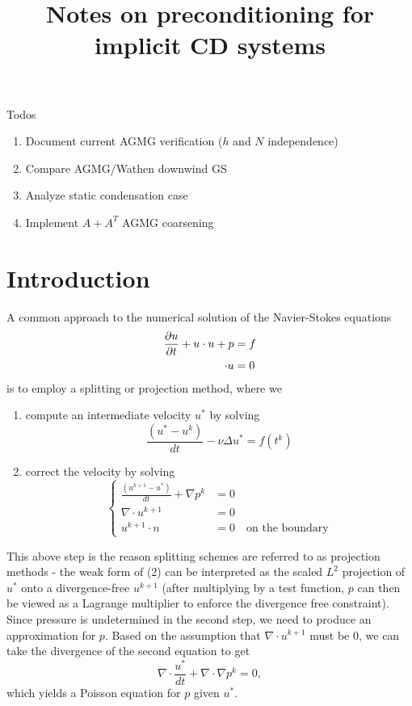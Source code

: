 \documentclass[final,leqno]{siamltex}
\title{Notes on preconditioning for implicit CD systems}
\let\grad\relax
\newcommand{\grad}{\nabla}
\renewcommand{\div}{\grad \cdot}
\newcommand{\pd}[2]{\frac{\partial#1}{\partial#2}}
\begin{document}
\maketitle
Todos
\begin{enumerate}
\item Document current AGMG verification ($h$ and $N$ independence)
\item Compare AGMG/Wathen downwind GS
\item Analyze static condensation case
\item Implement $A+A^T$ AGMG coarsening
\end{enumerate}

\section{Introduction}

A common approach to the numerical solution of the Navier-Stokes equations
\begin{align*}
\pd{u}{t} + u\cdot\grad u + \grad p &= f \\
\div u &= 0
\end{align*}
is to employ a splitting or projection method, where we 
\begin{enumerate}
\item compute an intermediate velocity $u^*$ by solving $$\frac{(u^*-u^k)}{dt} - \nu\Delta u^* = f(t^k)$$
\item correct the velocity by solving 
$$\begin{cases}
\frac{(u^{k+1}-u^*)}{dt} + \nabla p^k &= 0\\
\nabla \cdot u^{k+1} &= 0\\
u^{k+1}\cdot n &= 0 \quad \text{on the boundary}
\end{cases}$$
\end{enumerate}
This above step is the reason splitting schemes are referred to as projection methods - the weak form of (2) can be interpreted as the scaled $L^2$ projection of $u^*$ onto a divergence-free $u^{k+1}$ (after multiplying by a test function, $p$ can then be viewed as a Lagrange multiplier to enforce the divergence free constraint).  Since pressure is undetermined in the second step, we need to produce an approximation for $p$.  Based on the assumption that $\nabla \cdot u^{k+1}$ must be $0$, we can take the divergence of the second equation to get $$\nabla \cdot \frac{u^*}{dt} + \nabla\cdot \nabla p^k = 0,$$ which yields a Poisson equation for $p$ given $u^*$. 
\end{document}
